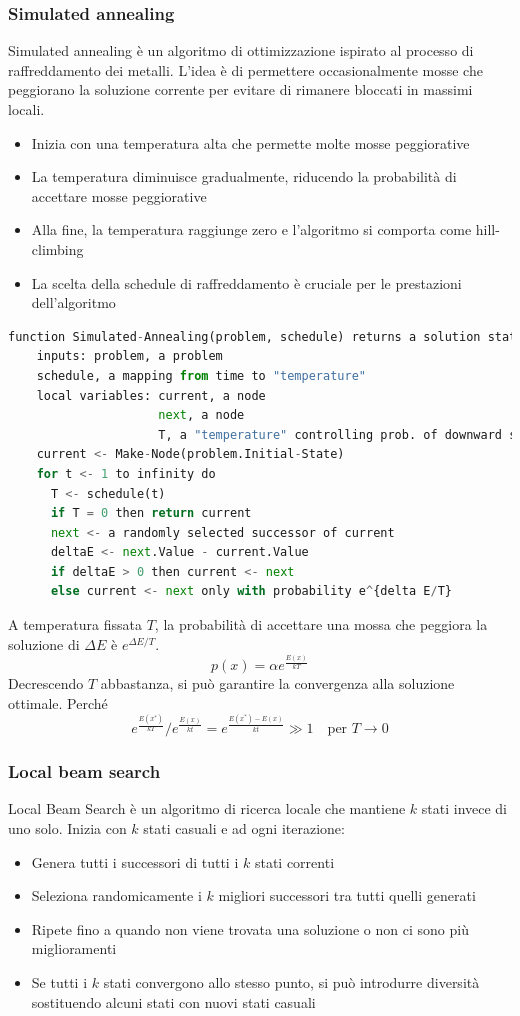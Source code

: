 \documentclass[a4paper]{article}
\begin{document}
\subsubsection{Simulated annealing}

Simulated annealing è un algoritmo di ottimizzazione ispirato al processo di 
raffreddamento dei metalli. L'idea è di permettere occasionalmente mosse che peggiorano la soluzione corrente
per evitare di rimanere bloccati in massimi locali.
\begin{itemize}
  \item Inizia con una temperatura alta che permette molte mosse peggiorative
  \item La temperatura diminuisce gradualmente, riducendo la probabilità di accettare mosse peggiorative
  \item Alla fine, la temperatura raggiunge zero e l'algoritmo si comporta come hill-climbing
  \item La scelta della schedule di raffreddamento è cruciale per le prestazioni dell'algoritmo
\end{itemize}
\begin{lstlisting}[language=Python]
function Simulated-Annealing(problem, schedule) returns a solution state
    inputs: problem, a problem
    schedule, a mapping from time to "temperature"
    local variables: current, a node
                     next, a node
                     T, a "temperature" controlling prob. of downward steps
    current <- Make-Node(problem.Initial-State)
    for t <- 1 to infinity do
      T <- schedule(t)
      if T = 0 then return current
      next <- a randomly selected successor of current
      deltaE <- next.Value - current.Value
      if deltaE > 0 then current <- next
      else current <- next only with probability e^{delta E/T} 
\end{lstlisting}
A temperatura fissata $T$, la probabilità di accettare una mossa che peggiora la soluzione di $\Delta E$ è $e^{\Delta E / T}$.
\[p(x) = \alpha e^{\frac{E(x)}{kT}}\]
Decrescendo $T$ abbastanza, si può garantire la convergenza alla soluzione ottimale.
Perché
\[e^{\frac{E(x^*)}{kT}} / e^{\frac{E(x)}{kt}} = e^{\frac{E(x^*) - E(x)}{kt}} \gg 1 \quad \text{per } T \to 0\]

\subsubsection{Local beam search}

Local Beam Search è un algoritmo di ricerca locale che mantiene $k$ stati invece di uno solo. Inizia con $k$ stati casuali
e ad ogni iterazione:
\begin{itemize}
  \item Genera tutti i successori di tutti i $k$ stati correnti
  \item Seleziona randomicamente i $k$ migliori successori tra tutti quelli generati
  \item Ripete fino a quando non viene trovata una soluzione o non ci sono più miglioramenti
  \item Se tutti i $k$ stati convergono allo stesso punto, si può introdurre
    diversità sostituendo alcuni stati con nuovi stati casuali
\end{itemize}
\end{document}
